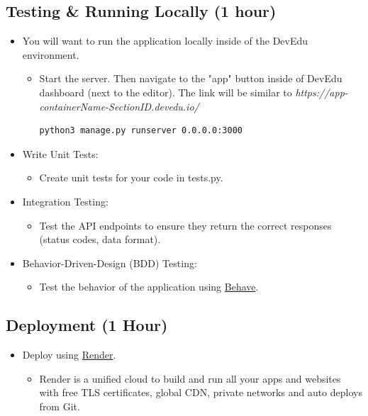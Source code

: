 \documentclass{article}
\begin{document}
\subsection{Testing \& Running Locally (1 hour)}
\begin{itemize}
    \item You will want to run the application locally inside of the DevEdu environment.
    \begin{itemize}
        \item Start the server. Then navigate to the "app" button inside of DevEdu dashboard (next to the editor). The link will be similar to \textit{https://app-containerName-SectionID.devedu.io/}
        \begin{lstlisting}[style=customcode,language=bash]
python3 manage.py runserver 0.0.0.0:3000
\end{lstlisting}
    \end{itemize}

    \item Write Unit Tests: 
    \begin{itemize}
        \item Create unit tests for your code in tests.py.
    \end{itemize}
\end{itemize}
\begin{itemize}
    \item Integration Testing: 
    \begin{itemize}
        \item Test the API endpoints to ensure they return the correct responses (status codes, data format).
    \end{itemize}
\end{itemize}
\begin{itemize}
    \item Behavior-Driven-Design (BDD) Testing: 
    \begin{itemize}
        \item Test the behavior of the application using \href{https://behave-django.readthedocs.io/en/stable/}{Behave}.
    \end{itemize}
\end{itemize}

\subsection{Deployment (1 Hour)}
\begin{itemize}
    \item Deploy using \href{https://render.com/docs/deploy-django}{Render}.
     \begin{itemize}
        \item Render is a unified cloud to build and run all your apps and websites with free TLS certificates, global CDN, private networks and auto deploys from Git.
    \end{itemize}
\end{itemize}
\end{document}
